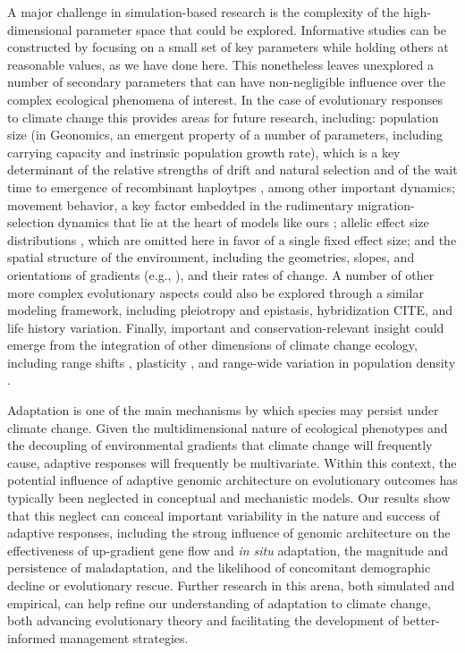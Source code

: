 \documentclass[9pt,twocolumn,twoside,lineno]{pnas-new}
\begin{document}
A major challenge in simulation-based research is the complexity of the high-dimensional 
parameter space that could be explored.
Informative studies can be constructed by focusing on a small set of
key parameters while holding others at reasonable values, as we have done here.
This nonetheless leaves unexplored a number of secondary parameters
that can have non-negligible influence over the complex ecological phenomena of interest.
In the case of evolutionary responses to climate change
this provides areas for future research, including:
population size (in Geonomics, an emergent property of
a number of parameters, including carrying capacity
and instrinsic population growth rate), which is a key determinant of the relative strengths of drift
and natural selection \cite{murray} and of the wait time to emergence of
recombinant haploytpes \cite{christiansen}, among other important dynamics;
movement behavior, a key factor embedded in the rudimentary
migration-selection dynamics that lie at the heart of models like ours
\cite{wright,haldane,barton};
allelic effect size distributions \cite{orr},
which are omitted here in favor of a single fixed effect size;
and the spatial structure of the environment,
including the geometries, slopes, and orientations of gradients
(e.g., \cite{benes}), and their rates of change.
A number of other more complex evolutionary aspects could also be explored 
through a similar modeling framework, including 
pleiotropy \cite{thompson} and epistasis,
hybridization CITE, and life history variation.
Finally, important and conservation-relevant insight could emerge from the 
integration of other dimensions of climate change ecology, including range shifts 
\cite{weiss-lehman}, plasticity \cite{chevin},
and range-wide variation in population density \cite{aitken_whitlock}.

Adaptation is one of the main mechanisms by which species
may persist under climate change.
Given the multidimensional nature of ecological phenotypes
and the decoupling of environmental gradients that
climate change will frequently cause,
adaptive responses will frequently be multivariate.
Within this context, the potential influence of adaptive genomic architecture
on evolutionary outcomes has typically been neglected
in conceptual and mechanistic models.
Our results show that this neglect can
conceal important variability in the nature
and success of adaptive responses,
including the strong influence of genomic architecture
on the effectiveness
of up-gradient gene flow and \textit{in situ} adaptation,
the magnitude and persistence
of maladaptation,
and the likelihood of concomitant demographic decline
or evolutionary rescue.
Further research in this arena, both simulated and empirical,
can help refine our understanding of adaptation to climate change,
both advancing evolutionary theory
and facilitating the development of better-informed management strategies.
\end{document}
